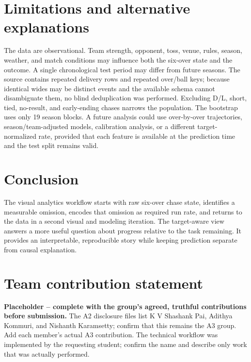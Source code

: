 \documentclass[11pt]{article}
\begin{document}
\section{Limitations and alternative explanations}
The data are observational. Team strength, opponent, toss, venue, rules, season, weather, and match conditions may influence both the six-over state and the outcome. A single chronological test period may differ from future seasons. The source contains repeated delivery rows and repeated over/ball keys; because identical wides may be distinct events and the available schema cannot disambiguate them, no blind deduplication was performed. Excluding D/L, short, tied, no-result, and early-ending chases narrows the population. The bootstrap uses only 19 season blocks. A future analysis could use over-by-over trajectories, season/team-adjusted models, calibration analysis, or a different target-normalized rate, provided that each feature is available at the prediction time and the test split remains valid.

\section{Conclusion}
The visual analytics workflow starts with raw six-over chase state, identifies a measurable omission, encodes that omission as required run rate, and returns to the data in a second visual and modeling iteration. The target-aware view answers a more useful question about progress relative to the task remaining. It provides an interpretable, reproducible story while keeping prediction separate from causal explanation.

\section{Team contribution statement}
\textbf{Placeholder -- complete with the group's agreed, truthful contributions before submission.} The A2 disclosure files list K V Shashank Pai, Adithya Kommuri, and Nishanth Karamsetty; confirm that this remains the A3 group. Add each member's actual A3 contribution. The technical workflow was implemented by the requesting student; confirm the name and describe only work that was actually performed.
\end{document}
